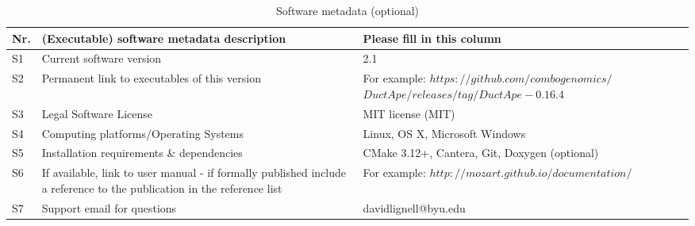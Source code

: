 \documentclass[preprint,12pt, a4paper]{elsarticle}
\begin{document}
\begin{table}[!h]
\begin{tabular}{|l|p{6.5cm}|p{6.5cm}|}
\hline
\textbf{Nr.} & \textbf{(Executable) software metadata description} & \textbf{Please fill in this column} \\
\hline
S1 & Current software version & 2.1 \\
\hline
S2 & Permanent link to executables of this version  & For example: $https://github.com/combogenomics/$ $DuctApe/releases/tag/DuctApe-0.16.4$ \\
\hline
S3 & Legal Software License & MIT license (MIT) \\
\hline
S4 & Computing platforms/Operating Systems & Linux, OS X, Microsoft Windows\\
\hline
S5 & Installation requirements \& dependencies & CMake 3.12+, Cantera, Git, Doxygen (optional) \\
\hline
S6 & If available, link to user manual - if formally published include a reference to the publication in the reference list & For example: $http://mozart.github.io/documentation/$ \\
\hline
S7 & Support email for questions & davidlignell@byu.edu \\
\hline
\end{tabular}
\caption{Software metadata (optional)}
\end{table}
\end{document}
